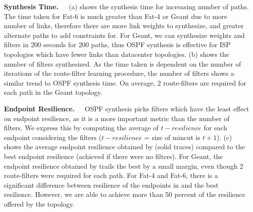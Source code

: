 \noindent\textbf{Synthesis Time.}~~~(a) 
shows the synthesis time for increasing number of paths. 
The time taken for Fat-6 is much greater than Fat-4 or Geant
due to more number of links, therefore there are more link weights
to synthesize, and greater alternate paths to add constraints for. 
For Geant, we can synthesize weights and filters in 200 seconds 
for 200 paths, thus OSPF synthesis is effective for ISP topologies
which have fewer links than datacenter topologies. 
(b) shows the number of filters synthesized. 
As the time taken is dependent on the number of iterations of
the route-filter learning procedure, the number of filters
shows a similar trend to OSPF synthesis time. On average, 2 route-filters
are required for each path in the Geant topology. 

\noindent\textbf{Endpoint Resilience.}~~~OSPF synthesis picks
filters which have the least effect on endpoint resilience, as it  
is a more important metric than the number of filters. We express this
by computing the average of $t-resilience$ for each endpoint considering
the filters ($t-resilience$ = size of mincut is $t+1$).
(c) shows the average
endpoint resilience obtained by \name (solid traces) 
compared to the best endpoint resilience (achieved
if there were no filters). For Geant, the endpoint 
resilience obtained by \name trails the best by a small margin,
even though 2 route-filters were required for each path. For
Fat-4 and Fat-6, there is a significant difference between resilience
of the endpoints in \name and the best resilience. 
However, we are able to achieve more than
50 percent of the resilience offered by the topology. 

